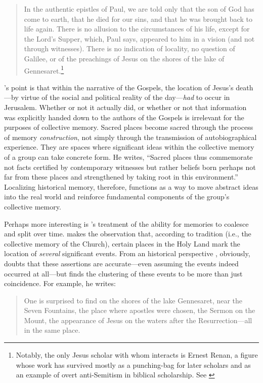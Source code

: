 \begin{quote}
    In the authentic epistles of Paul, we are told only that the son of God has come to earth, that he died for our sins, and that he was brought back to life again. There is no allusion to the circumstances of his life, except for the Lord's Supper, which, Paul says, appeared to him in a vision (and not through witnesses). There is no indication of locality, no question of Galilee, or of the preachings of Jesus on the shores of the lake of Gennesaret.\autocite[209]{halbwachs1992}\footnote{Notably, the only Jesus scholar with whom \halbwachs interacts is Ernest Renan, a figure whose work has survived mostly as a punching-bag for later scholars and as an example of overt anti-Semitism in biblical scholarship. See \cite[39]{heschel2008}}
\end{quote}  

\halbwachs's point is that within the narrative of the Gospels, the location of Jesus's death---by virtue of the social and political reality of the day---\emph{had} to occur in Jerusalem.\autocite[211]{halbwachs1992} Whether or not it actually did, or whether or not that information was explicitly handed down to the authors of the Gospels is irrelevant for the purposes of collective memory. Sacred places become sacred through the process of memory \emph{construction}, not simply through the transmission of autobiographical experience. They are spaces where significant ideas within the collective memory of a group can take concrete form. He writes, ``Sacred places thus commemorate not facts certified by contemporary witnesses but rather beliefs born perhaps not far from these places and strengthened by taking root in this environment.''\autocite[199]{halbwachs1992} Localizing historical memory, therefore, functions as a way to move abstract ideas into the real world and reinforce fundamental components of the group's collective memory.  

Perhaps more interesting is \halbwachs's treatment of the ability for memories to coalesce and split over time. \halbwachs makes the observation that, according to tradition (i.e., the collective memory of the Church), certain places in the Holy Land mark the location of \emph{several} significant events. From an historical perspective \halbwachs, obviously, doubts that these assertions are accurate---even assuming the events indeed occurred at all---but finds the clustering of these events to be more than just coincidence. For example, he writes:  

\begin{quote}
One is surprised to find on the shores of the lake Gennesaret, near the Seven Fountains, the place where apostles were chosen, the Sermon on the Mount, the appearance of Jesus on the waters after the Resurrection---all in the same place.\autocite[220]{halbwachs1992}
\end{quote}  

